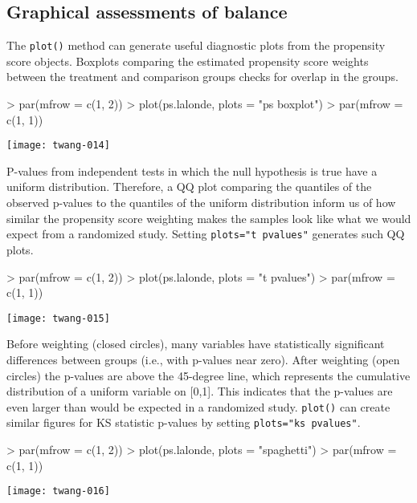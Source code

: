 \documentclass{article}
\begin{document}
\subsection{Graphical assessments of balance}

The \texttt{plot()} method can generate useful diagnostic plots from the
propensity score objects. Boxplots comparing the estimated propensity score weights
between the treatment and comparison groups checks for overlap in the groups.

\begin{Schunk}
\begin{Sinput}
> par(mfrow = c(1, 2))
> plot(ps.lalonde, plots = "ps boxplot")
> par(mfrow = c(1, 1))
\end{Sinput}
\end{Schunk}
\texttt{[image: twang-014]}

P-values from independent tests in which the null hypothesis is true have a
uniform distribution. Therefore, a QQ plot comparing the quantiles of the
observed p-values to the quantiles of the uniform distribution inform us of
how similar the propensity score weighting makes the samples look like what we
would expect from a randomized study. Setting \texttt{plots="t pvalues"}
generates such QQ plots.

\begin{Schunk}
\begin{Sinput}
> par(mfrow = c(1, 2))
> plot(ps.lalonde, plots = "t pvalues")
> par(mfrow = c(1, 1))
\end{Sinput}
\end{Schunk}
\texttt{[image: twang-015]}

Before weighting (closed circles), many variables have statistically
significant differences between groups (i.e., with p-values near zero). After
weighting (open circles) the p-values are above the 45-degree line, which
represents the cumulative distribution of a uniform variable on [0,1]. This
indicates that the p-values are even larger than would be expected in a
randomized study. \texttt{plot()} can create similar figures for KS statistic
p-values by setting \texttt{plots="ks pvalues"}.

\begin{Schunk}
\begin{Sinput}
> par(mfrow = c(1, 2))
> plot(ps.lalonde, plots = "spaghetti")
> par(mfrow = c(1, 1))
\end{Sinput}
\end{Schunk}
\texttt{[image: twang-016]}
\end{document}
